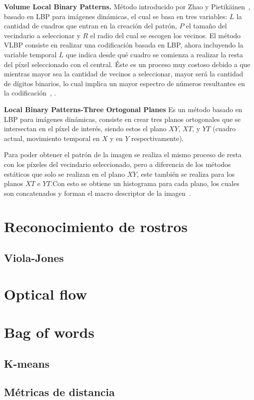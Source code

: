 		\textbf{Volume Local Binary Patterns.}
		\label{sec:vlbp}
		Método introducido por Zhao y Pietikäinen~\cite{Zhao2006}, basado en LBP para imágenes dinámicas, el cual se basa en tres variables: $L$ la cantidad de cuadros que entran en la creación del patrón, $P$ el tamaño del vecindario a seleccionar y $R$ el radio del cual se escogen los vecinos. 
El método VLBP consiste en realizar una codificación basada en LBP, ahora incluyendo la variable temporal $L$ que indica desde qué cuadro se comienza a realizar la resta del píxel seleccionado con el central.
Éste es un proceso muy costoso debido a que mientras mayor sea la cantidad de vecinos a seleccionar, mayor será la cantidad de dígitos binarios, lo cual implica un mayor espectro de números resultantes en la codificación~\cite{Zhao2007a}, \cite{Zhao2007}.

		\textbf{Local Binary Patterns-Three Ortogonal Planes}
		\label{sec:lbp-top}
		 Es un método basado en LBP para imágenes dinámicas, consiste en crear tres planos ortogonales que se intersectan en el píxel de interés, siendo estos el plano $XY$, $XT$, y $YT$ (cuadro actual, movimiento temporal en $X$ y en $Y$ respectivamente). 

Para poder obtener el patrón de la imagen se realiza el mismo proceso de resta con los píxeles del vecindario seleccionado, pero a diferencia de los métodos estáticos que solo se realizan en el plano $XY$, este también se realiza para los planos $XT$ e $YT$.\@ Con esto se obtiene un histograma para cada plano, los cuales son concatenados y forman el macro descriptor de la imagen~\cite{Zhao2007}.


\section{Reconocimiento de rostros}
\label{sec:rec_rostros}

	\subsection{Viola-Jones}
	\label{sec:viola-jones}

\section{Optical flow}
\label{sec:optical_flow}

\section{Bag of words}
\label{sec:bag_of_words}

	\subsection{K-means}
	\label{sec:k-means}
	
	\subsection{Métricas de distancia}
	\label{sec:matricas_de_distancia}